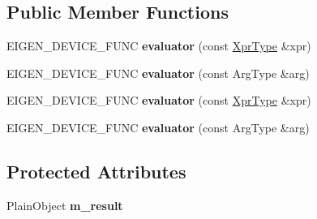 \subsection*{Public Member Functions}
\begin{DoxyCompactItemize}
\item 
\mbox{\label{struct_eigen_1_1internal_1_1evaluator_3_01_eval_to_temp_3_01_arg_type_01_4_01_4_a61d507b4e4d9bd8654718dbfaffb5214}} 
E\+I\+G\+E\+N\+\_\+\+D\+E\+V\+I\+C\+E\+\_\+\+F\+U\+NC {\bfseries evaluator} (const \hyperlink{class_eigen_1_1internal_1_1_eval_to_temp}{Xpr\+Type} \&xpr)
\item 
\mbox{\label{struct_eigen_1_1internal_1_1evaluator_3_01_eval_to_temp_3_01_arg_type_01_4_01_4_a2bc9d547a2c72e14eeca64edbeb1c303}} 
E\+I\+G\+E\+N\+\_\+\+D\+E\+V\+I\+C\+E\+\_\+\+F\+U\+NC {\bfseries evaluator} (const Arg\+Type \&arg)
\item 
\mbox{\label{struct_eigen_1_1internal_1_1evaluator_3_01_eval_to_temp_3_01_arg_type_01_4_01_4_a61d507b4e4d9bd8654718dbfaffb5214}} 
E\+I\+G\+E\+N\+\_\+\+D\+E\+V\+I\+C\+E\+\_\+\+F\+U\+NC {\bfseries evaluator} (const \hyperlink{class_eigen_1_1internal_1_1_eval_to_temp}{Xpr\+Type} \&xpr)
\item 
\mbox{\label{struct_eigen_1_1internal_1_1evaluator_3_01_eval_to_temp_3_01_arg_type_01_4_01_4_a2bc9d547a2c72e14eeca64edbeb1c303}} 
E\+I\+G\+E\+N\+\_\+\+D\+E\+V\+I\+C\+E\+\_\+\+F\+U\+NC {\bfseries evaluator} (const Arg\+Type \&arg)
\end{DoxyCompactItemize}
\subsection*{Protected Attributes}
\begin{DoxyCompactItemize}
\item 
\mbox{\label{struct_eigen_1_1internal_1_1evaluator_3_01_eval_to_temp_3_01_arg_type_01_4_01_4_ae408b6313445dcccd8be5dc588e6f88b}} 
Plain\+Object {\bfseries m\+\_\+result}
\end{DoxyCompactItemize}


